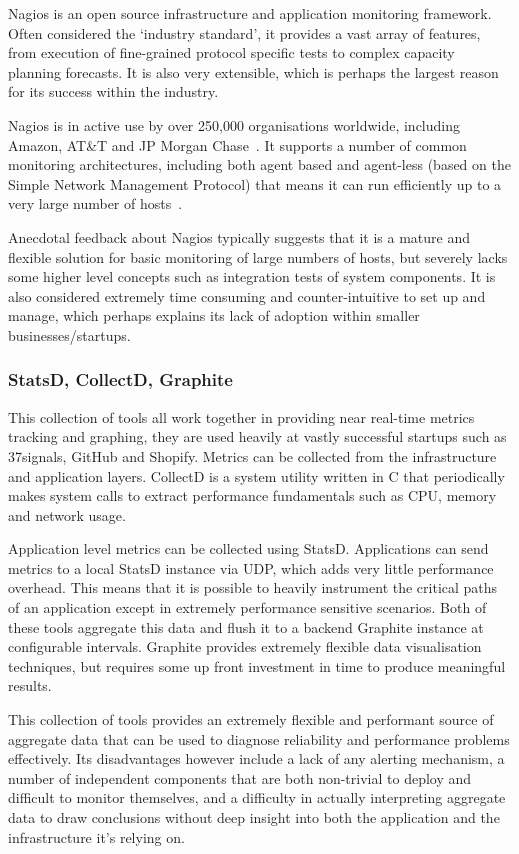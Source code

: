 \documentclass{cshonours}
\begin{document}
Nagios is an open source infrastructure and application monitoring framework. Often considered the `industry standard', it provides a vast array of features, from execution of fine-grained protocol specific tests to complex capacity planning forecasts. It is also very extensible, which is perhaps the largest reason for its success within the industry.

Nagios is in active use by over 250,000 organisations worldwide, including Amazon, AT\&T and JP Morgan Chase~\cite{NagiosUsage}. It supports a number of common monitoring architectures, including both agent based and agent-less (based on the Simple Network Management Protocol) that means it can run efficiently up to a very large number of hosts~\cite{NagiosArchitectures}.

Anecdotal feedback about Nagios typically suggests that it is a mature and flexible solution for basic monitoring of large numbers of hosts, but severely lacks some higher level concepts such as integration tests of system components. It is also considered extremely time consuming and counter-intuitive to set up and manage, which perhaps explains its lack of adoption within smaller businesses/startups.

\subsubsection{StatsD, CollectD, Graphite}

This collection of tools all work together in providing near real-time metrics tracking and graphing, they are used heavily at vastly successful startups such as 37signals, GitHub and Shopify. Metrics can be collected from the infrastructure and application layers. 
CollectD is a system utility written in C that periodically makes system calls to extract performance fundamentals such as CPU, memory and network usage. 

\label{StatsD}
Application level metrics can be collected using StatsD. Applications can send metrics to a local StatsD instance via UDP, which adds very little performance overhead. This means that it is possible to heavily instrument the critical paths of an application except in extremely performance sensitive scenarios. Both of these tools aggregate this data and flush it to a backend Graphite instance at configurable intervals. Graphite provides extremely flexible data visualisation techniques, but requires some up front investment in time to produce meaningful results.

This collection of tools provides an extremely flexible and performant source of aggregate data that can be used to diagnose reliability and performance problems effectively. Its disadvantages however include a lack of any alerting mechanism, a number of independent components that are both non-trivial to deploy and difficult to monitor themselves, and a difficulty in actually interpreting aggregate data to draw conclusions without deep insight into both the application and the infrastructure it’s relying on.
\end{document}
